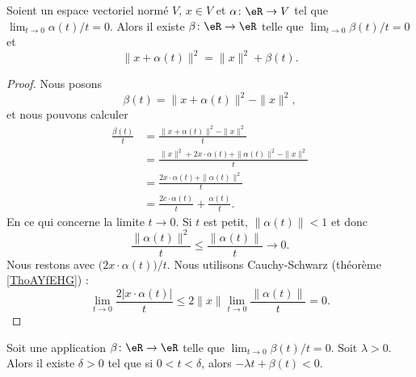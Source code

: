 \begin{proposition}	\label{PROPooFEUKooKHDuMM}
	Soient un espace vectoriel normé \( V\), \( x\in V\) et \(\alpha \colon \eR\to V  \) tel que \( \lim_{t\to 0}\alpha(t)/t=0\). Alors il existe \(\beta \colon \eR\to \eR  \) telle que \( \lim_{t\to 0}\beta(t)/t=0\) et
	\begin{equation}
		\| x+\alpha(t) \|^2=\| x \|^2+\beta(t).
	\end{equation}
\end{proposition}

\begin{proof}
	Nous posons
	\begin{equation}
		\beta(t)=\| x+\alpha(t) \|^2-\| x \|^2,
	\end{equation}
	et nous pouvons calculer
	\begin{subequations}
		\begin{align}
			\frac{ \beta(t) }{ t } & =\frac{ \| x+\alpha(t) \|^2-\| x \|^2 }{ t }                           \\
			                       & =\frac{ \| x \|^2+2x\cdot \alpha(t)+\| \alpha(t) \|^2-\| x \|^2 }{ t } \\
			                       & =\frac{ 2x\cdot \alpha(t)+\| \alpha(t) \|^2 }{ t }                     \\
			                       & =\frac{ 2c\cdot \alpha(t) }{ t }+\frac{ \alpha(t) }{ t }.
		\end{align}
	\end{subequations}
	En ce qui concerne la limite \( t\to 0\). Si \( t\) est petit, \( \| \alpha(t) \|<1\) et donc
	\begin{equation}
		\frac{ \| \alpha(t) \|^2 }{ t }\leq \frac{ \| \alpha(t) \| }{ t }\to 0.
	\end{equation}
	Nous restons avec \( \big(2x\cdot \alpha(t)\big)/t\). Nous utilisons Cauchy-Schwarz (théorème \ref{ThoAYfEHG}) :
	\begin{equation}
		\lim_{t\to 0}\frac{ 2| x\cdot \alpha(t) | }{ t }\leq 2\| x \|\lim_{t\to 0}\frac{ \| \alpha(t) \| }{ t }=0.
	\end{equation}
\end{proof}

\begin{lemma}	\label{LEMooXRDQooIAVgTm}
	Soit une application \(\beta \colon \eR\to \eR  \) telle que \( \lim_{t\to 0} \beta(t)/t= 0\). Soit \( \lambda>0\). Alors il existe \( \delta>0\) tel que si \( 0<t<\delta\), alors \( -\lambda t+\beta(t)<0\).
\end{lemma}

